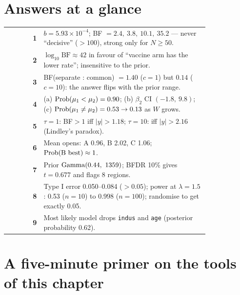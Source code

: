 \documentclass[11pt]{article}
\begin{document}

\tableofcontents
\clearpage

\section*{Answers at a glance}
\begin{center}
\small
\renewcommand{\arraystretch}{1.25}
\begin{tabular}{>{\bfseries\color{navy}}r p{0.82\linewidth}}\toprule
1 & $b=5.93\times10^{-4}$; BF $=2.4,\ 3.8,\ 10.1,\ 35.2$ --- never ``decisive'' ($>100$), strong only for $N\ge50$.\\
2 & $\log_{10}\text{BF}\approx42$ in favour of ``vaccine arm has the lower rate''; insensitive to the prior.\\
3 & BF(separate : common) $=1.40$ ($c=1$) but $0.14$ ($c=10$): the answer flips with the prior range.\\
4 & (a) $\mathrm{Prob}(\mu_1<\mu_2)=0.90$; (b) $\beta_2$ CI $(-1.8,\ 9.8)$; (c) $\mathrm{Prob}(\mu_1\neq\mu_2)=0.53\to0.13$ as $W$ grows.\\
5 & $\tau=1$: BF$>1$ iff $|y|>1.18$; $\tau=10$: iff $|y|>2.16$ (Lindley's paradox).\\
6 & Mean opens: A 0.96, B 2.02, C 1.06; $\mathrm{Prob}(\text{B best})\approx1$.\\
7 & Prior $\mathrm{Gamma}(0.44,\ 1359)$; BFDR 10\% gives $t=0.677$ and flags 8 regions.\\
8 & Type I error 0.050--0.084 ($>0.05$); power at $\lambda=1.5$: 0.53 ($n=10$) to 0.998 ($n=100$); randomise to get exactly 0.05.\\
9 & Most likely model drops \texttt{indus} and \texttt{age} (posterior probability 0.62).\\\bottomrule
\end{tabular}
\end{center}
\clearpage

\section*{A five-minute primer on the tools of this chapter}
\end{document}
